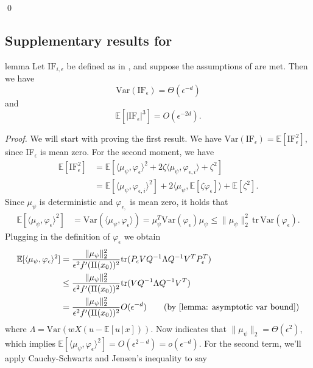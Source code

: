 \documentclass[11pt]{article}
\begin{document}
\qed{}

\subsection{Supplementary results for }

\begin{restatable}{lemma}{}
  Let $\text{IF}_{i, \epsilon}$ be defined as in , and suppose the assumptions of  are met. Then we have
  \[\text{Var}(\text{IF}_{\epsilon}) = \Theta(\epsilon^{-d})\]
  and 
  \[\mathbb{E}[|\text{IF}_{\epsilon}|^3] = O(\epsilon^{-2d}).\]
  \label{lemma: if bound}
\end{restatable}
\noindent \textit{Proof.} We will start with proving the first result. We have $\text{Var}(\text{IF}_{ \epsilon}) = \mathbb{E}[\text{IF}_{\epsilon}^2]$, since IF$_{ \epsilon}$ is mean zero. For the second moment, we have
\begin{align*}
    \mathbb{E}[\text{IF}_{\epsilon}^2] &= \mathbb{E}[\langle \mu_{\psi}, \varphi_{\epsilon}\rangle^2 + 2\zeta\langle \mu_{\psi}, \varphi_{\epsilon, i}\rangle + \zeta^2] \\
    &= \mathbb{E}[\langle \mu_{\psi}, \varphi_{\epsilon, i}\rangle^2] + 2\langle \mu_{\psi}, \mathbb{E}[\zeta \varphi_{ \epsilon}]\rangle + \mathbb{E}[\zeta^2]. 
\end{align*}
Since $\mu_\psi$ is deterministic and $\varphi_{\epsilon,}$ is mean zero, it holds that 
\begin{align*}
    \mathbb{E}[\langle \mu_{\psi}, \varphi_{\epsilon}\rangle^2] &= \text{Var}(\langle \mu_\psi, \varphi_{\epsilon}\rangle)  = \mu_\psi^T\text{Var}(\varphi_{\epsilon})\mu_\psi \leq \|\mu_\psi\|_2^2\,\text{tr}\,\text{Var}(\varphi_{\epsilon}).
\end{align*}
Plugging in the definition of $\varphi_{\epsilon}$ we obtain
\begin{align*}
\mathbb{E}[\langle \mu_{\psi}, \varphi_{\epsilon}\rangle^2] &= \frac{\|\mu_\psi\|_2^2}{\epsilon^2f'(\Pi(x_0))^2}\text{tr}(P_{\epsilon}VQ^{-1}\Lambda Q^{-1}V^TP_{\epsilon}^T) \\
&\leq \frac{\|\mu_\psi\|_2^2}{\epsilon^2f'(\Pi(x_0))^2}\text{tr}(VQ^{-1}\Lambda Q^{-1}V^T) \\
&= \frac{\|\mu_\psi\|_2^2}{\epsilon^2f'(\Pi(x_0))^2}O(\epsilon^{-d}) \tag{by \Cref{lemma: asymptotic var bound}}
\end{align*}
where $\Lambda = \text{Var}(wX(u - \mathbb{E}[u \,|\, x]))$. Now  indicates that $\|\mu_\psi\|_2 = \Theta(\epsilon^2)$, which implies $\mathbb{E}[\langle \mu_{\psi}, \varphi_{\epsilon}\rangle^2] = O(\epsilon^{2-d}) = o(\epsilon^{-d})$. For the second term, we'll apply Cauchy-Schwartz and Jensen's inequality to say
\end{document}
